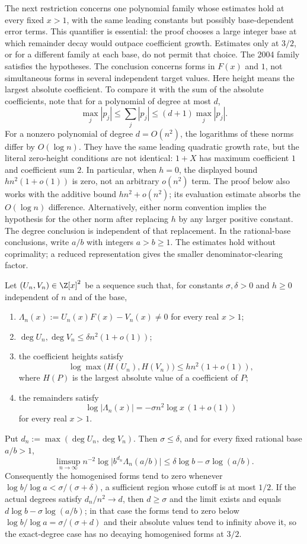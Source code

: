 The next restriction concerns one polynomial family whose estimates
hold at every fixed $x>1$, with the same leading constants but
possibly base-dependent error terms. This quantifier is essential:
the proof chooses a large integer base at which remainder decay
would outpace coefficient growth. Estimates only at $3/2$, or for
a different family at each base, do not permit that choice. The
2004 family satisfies the hypotheses. The conclusion concerns
forms in $F(x)$ and $1$, not simultaneous forms in several
independent target values. Here height means the largest absolute
coefficient. To compare it with the sum of the absolute coefficients,
note that for a polynomial of degree at most $d$,
\[
 \max_j|p_j|\le\sum_j|p_j|\le(d+1)\max_j|p_j|.
\]
For a nonzero polynomial of degree $d=O(n^2)$, the logarithms of
these norms differ by $O(\log n)$. They have the same leading
quadratic growth rate, but the literal zero-height conditions are
not identical: $1+X$ has maximum coefficient $1$ and coefficient sum
$2$. In particular, when $h=0$, the displayed bound
$hn^2(1+o(1))$ is zero, not an arbitrary $o(n^2)$ term.
The proof below also works with the additive bound $hn^2+o(n^2)$;
its evaluation estimate absorbs the $O(\log n)$ difference.
Alternatively, either norm convention implies the hypothesis for the
other norm after replacing $h$ by any larger positive constant.
The degree conclusion is independent of that replacement.
In the rational-base conclusions, write $a/b$ with integers $a>b\ge1$.
The estimates hold without coprimality; a reduced representation gives
the smaller denominator-clearing factor.

\begin{theorem}\label{long1049:res:archcap}
Let $(U_n,V_n)\in\Z[x]^{2}$ be a sequence such that, for constants
$\sigma,\delta>0$ and $h\ge0$ independent of $n$ and of the base,
\begin{enumerate}
\item $\Lambda_n(x):=U_n(x)F(x)-V_n(x)\ne0$ for every real $x>1$;
\item $\deg U_n,\deg V_n\le\delta n^{2}(1+o(1))$;
\item the coefficient heights satisfy
\[
 \log\max\bigl(H(U_n),H(V_n)\bigr)\le hn^{2}(1+o(1)),
\]
where $H(P)$ is the
largest absolute value of a coefficient of $P$;
\item the remainders satisfy
\[
 \log|\Lambda_n(x)|=-\sigma n^{2}\log x\,(1+o(1))
\]
for every real $x>1$.
\end{enumerate}
Put $d_n:=\max(\deg U_n,\deg V_n)$.  Then $\sigma\le\delta$, and for every fixed
rational base $a/b>1$,
\[
 \limsup_{n\to\infty}n^{-2}\log\bigl|b^{d_n}\Lambda_n(a/b)\bigr|
 \le\delta\log b-\sigma\log(a/b).
\]
Consequently the homogenised forms tend to zero whenever
$\log b/\log a<\sigma/(\sigma+\delta)$, a sufficient region whose cutoff is at
most $1/2$.  If the actual degrees satisfy $d_n/n^{2}\to d$, then $d\ge\sigma$
and the limit exists and equals $d\log b-\sigma\log(a/b)$; in that case the
forms tend to zero below $\log b/\log a=\sigma/(\sigma+d)$ and their absolute
values tend to infinity above it, so the exact-degree case has no decaying
homogenised forms at $3/2$.
\end{theorem}

